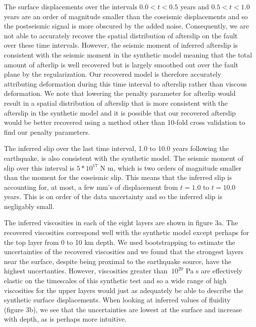 \documentclass[fleqn,12pt]{article}
\begin{document}
The surface displacements over the intervals $0.0<t<0.5$ years and
$0.5<t<1.0$ years are an order of magnitude smaller than the coseismic
displacements and so the postseismic signal is more obscured by the added
noise.  Consequently, we are not able to accurately recover the
spatial distribution of afterslip on the fault over these time
intervals.  However, the seismic moment of inferred afterslip is
consistent with the seismic moment in the synthetic model meaning that
the total amount of afterlip is well recovered but is largely smoothed
out over the fault plane by the regularization.  Our recovered model
is therefore accurately attributing deformation during this time
interval to afterslip rather than viscous deformation. We note that
lowering the penalty parameter for afterlip would result in a spatial
distribution of afterslip that is more consistent with the afterslip
in the synthetic model and it is possible that our recovered afterslip
would be better recovered using a method other than 10-fold cross
validation to find our penalty parameters.

The inferred slip over the last time interval, 1.0 to 10.0 years
following the earthquake, is also consistent with the synthetic model.
The seismic moment of slip over this interval is $5*10^{17}$ N m,
which is two orders of magnitude smaller than the moment for the
coseismic slip.  This means that the inferred slip is accounting for,
at most, a few mm's of displacement from $t=1.0$ to $t=10.0$ years.
This is on order of the data uncertainty and so the inferred slip is
negligably small.

The inferred viscosities in each of the eight layers are shown in
figure 3a.  The recovered viscosities correspond well with the
synthetic model except perhaps for the top layer from 0 to 10 km
depth.  We used bootstrapping to estimate the uncertainties of the
recovered viscosities and we found that the strongest layers near the
surface, despite being proximal to the earthquake source, have the
highest uncertanties.  However, viscosities greater than $~10^{20}$ Pa s are
effectively elastic on the timescales of this synthetic test and so a
wide range of high viscosities for the upper layers would just as
adequately be able to describe the synthetic surface displacements.
When looking at inferred values of fluidity (figure 3b), we see that
the uncertainties are lowest at the surface and increase with depth,
as is perhaps more intuitive.

\end{document}
